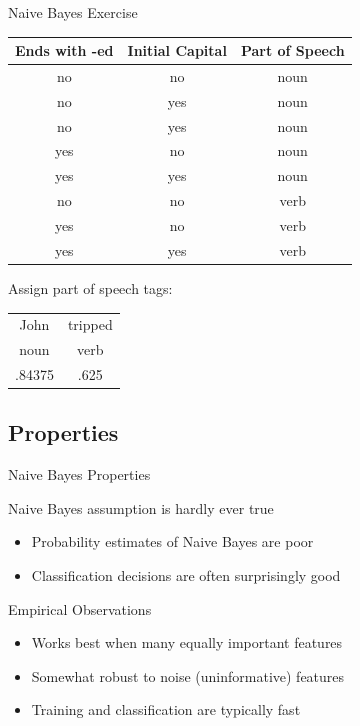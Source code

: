 \documentclass[14pt]{beamer}
\begin{document}
\begin{frame}{Naive Bayes Exercise}
	\begin{center}
		\begin{tabular}[t]{cc|c}
			Ends with -ed  & Initial Capital  & Part of Speech \\
			\hline
			no             & no               & noun \\
			no             & yes              & noun \\
			no             & yes              & noun \\
			yes            & no               & noun \\
			yes            & yes              & noun \\
			no             & no               & verb \\
			yes            & no               & verb \\
			yes            & yes              & verb \\
		\end{tabular}
		
		\bigskip
		Assign part of speech tags:
		\tab\tab
		\begin{tabular}[t]{cc}
			John            & tripped \\
			\pause
			noun            & verb    \\
			\pause
			.84375          & .625 \\
		\end{tabular}
	\end{center}
\end{frame}

\subsection{Properties}
\begin{frame}[<+->]{Naive Bayes Properties}
	\begin{block}{Naive Bayes assumption is hardly ever true}
		\begin{itemize}
			\item Probability estimates of Naive Bayes are poor
			\item Classification decisions are often surprisingly good
		\end{itemize}
	\end{block}
	\begin{block}{Empirical Observations}
		\begin{itemize}
			\item Works best when many equally important features
			\item Somewhat robust to noise (uninformative) features
			\item Training and classification are typically fast
		\end{itemize}
	\end{block}
\end{frame}
\end{document}
